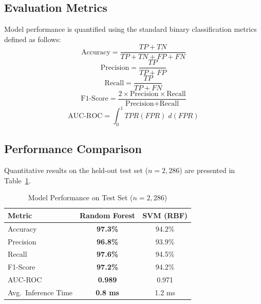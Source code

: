 \documentclass[conference]{IEEEtran}
\begin{document}
\subsection{Evaluation Metrics}

Model performance is quantified using the standard binary 
classification metrics defined as follows:
\begin{equation}
    \text{Accuracy} = \frac{TP + TN}{TP + TN + FP + FN}
    \label{eq:acc}
\end{equation}
\begin{equation}
    \text{Precision} = \frac{TP}{TP + FP}
    \label{eq:prec}
\end{equation}
\begin{equation}
    \text{Recall} = \frac{TP}{TP + FN}
    \label{eq:rec}
\end{equation}
\begin{equation}
    \text{F1-Score} = 
    \frac{2 \times \text{Precision} \times \text{Recall}}
         {\text{Precision} + \text{Recall}}
    \label{eq:f1}
\end{equation}
\begin{equation}
    \text{AUC-ROC} = \int_{0}^{1} TPR(FPR)\; d(FPR)
    \label{eq:auc}
\end{equation}

\subsection{Performance Comparison}

Quantitative results on the held-out test set 
($n = 2{,}286$) are presented in Table~\ref{tab:perf}.

\begin{table}[htbp]
\caption{Model Performance on Test Set ($n = 2{,}286$)}
\label{tab:perf}
\centering
\renewcommand{\arraystretch}{1.3}
\begin{tabular}{lcc}
\toprule
\textbf{Metric}       & \textbf{Random Forest} & \textbf{SVM (RBF)} \\
\midrule
Accuracy              & \textbf{97.3\%}        & 94.2\%             \\
Precision             & \textbf{96.8\%}        & 93.9\%             \\
Recall                & \textbf{97.6\%}        & 94.5\%             \\
F1-Score              & \textbf{97.2\%}        & 94.2\%             \\
AUC-ROC               & \textbf{0.989}         & 0.971              \\
Avg.\ Inference Time  & \textbf{0.8 ms}        & 1.2 ms             \\
\bottomrule
\end{tabular}
\end{table}
\end{document}
